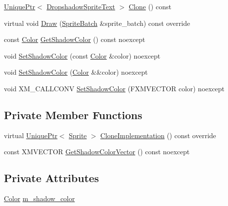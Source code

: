 \begin{DoxyCompactItemize}
\item 
\hyperlink{namespacemage_a3316d7143a973e37adf1110f2e80ca31}{Unique\+Ptr}$<$ \hyperlink{classmage_1_1_dropshadow_sprite_text}{Dropshadow\+Sprite\+Text} $>$ \hyperlink{classmage_1_1_dropshadow_sprite_text_a0dcce82b4a83fbd469d68adba21af220}{Clone} () const
\item 
virtual void \hyperlink{classmage_1_1_dropshadow_sprite_text_af76422c9812d7dc38e9b98e587103c67}{Draw} (\hyperlink{classmage_1_1_sprite_batch}{Sprite\+Batch} \&sprite\+\_\+batch) const override
\item 
const \hyperlink{structmage_1_1_color}{Color} \hyperlink{classmage_1_1_dropshadow_sprite_text_a5aebe32b778feb5e4f82ff11fbc4636f}{Get\+Shadow\+Color} () const noexcept
\item 
void \hyperlink{classmage_1_1_dropshadow_sprite_text_a2aceed81bffc3b6f51cf40bea0eb8405}{Set\+Shadow\+Color} (const \hyperlink{structmage_1_1_color}{Color} \&color) noexcept
\item 
void \hyperlink{classmage_1_1_dropshadow_sprite_text_aa05c94ba64df31046dbdfa3d4d0fdaeb}{Set\+Shadow\+Color} (\hyperlink{structmage_1_1_color}{Color} \&\&color) noexcept
\item 
void X\+M\+\_\+\+C\+A\+L\+L\+C\+O\+NV \hyperlink{classmage_1_1_dropshadow_sprite_text_a87dd66597ce516d139196d1ce26cb680}{Set\+Shadow\+Color} (F\+X\+M\+V\+E\+C\+T\+OR color) noexcept
\end{DoxyCompactItemize}
\subsection*{Private Member Functions}
\begin{DoxyCompactItemize}
\item 
virtual \hyperlink{namespacemage_a3316d7143a973e37adf1110f2e80ca31}{Unique\+Ptr}$<$ \hyperlink{classmage_1_1_sprite}{Sprite} $>$ \hyperlink{classmage_1_1_dropshadow_sprite_text_af997217dd243061e0490bbcd4bfde7ed}{Clone\+Implementation} () const override
\item 
const X\+M\+V\+E\+C\+T\+OR \hyperlink{classmage_1_1_dropshadow_sprite_text_aedbd1adb15584680abebab3784905834}{Get\+Shadow\+Color\+Vector} () const noexcept
\end{DoxyCompactItemize}
\subsection*{Private Attributes}
\begin{DoxyCompactItemize}
\item 
\hyperlink{structmage_1_1_color}{Color} \hyperlink{classmage_1_1_dropshadow_sprite_text_a6343fd2b2b2139d8a869c29a2a33531f}{m\+\_\+shadow\+\_\+color}
\end{DoxyCompactItemize}
